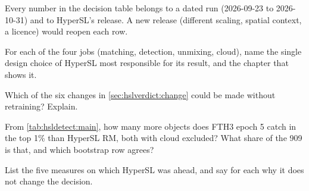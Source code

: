 \begin{drift}
Every number in the decision table belongs to a dated run (2026-09-23 to 2026-10-31) and to HyperSL's 
release. A new release (different scaling, spatial context, a licence) would reopen each row.
\end{drift}

\begin{confusions}
\end{confusions}

\begin{checkyourself}
\item\label{ex:hslverdict:1} For each of the four jobs (matching, detection, unmixing, cloud), name the single design choice of
  HyperSL most responsible for its result, and the chapter that shows it.
\item\label{ex:hslverdict:2} Which of the six changes in \cref{sec:hslverdict:change} could be made without retraining? Explain.
\item\label{ex:hslverdict:3} From \cref{tab:hsldetect:main}, how many more objects does FTH3 epoch 5 catch in the top 1\% than HyperSL RM,
  both with cloud excluded? What share of the 909 is that, and which bootstrap row agrees?
\item\label{ex:hslverdict:4} List the five measures on which HyperSL was ahead, and say for each why it does not change the
  decision.
\end{checkyourself}
